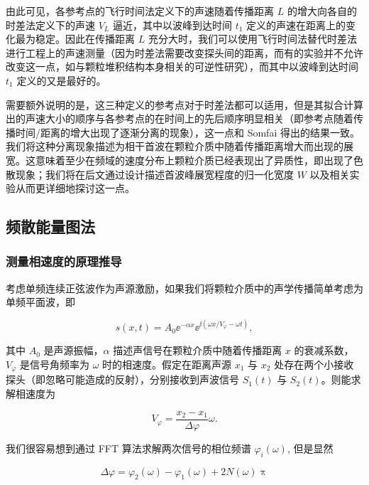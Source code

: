 由此可见，各参考点的飞行时间法定义下的声速随着传播距离 $L$ 的增大向各自的时差法定义下的声速 $V_{L}$ 逼近，其中以波峰到达时间 $t_{1}$ 定义的声速在距离上的变化最为稳定。因此在传播距离 $L$ 充分大时，我们可以使用飞行时间法替代时差法进行工程上的声速测量（因为时差法需要改变探头间的距离，而有的实验并不允许改变这一点，如与颗粒堆积结构本身相关的可逆性研究\cite{PhysRevE.84.020301}），而其中以波峰到达时间 $t_{1}$ 定义的又是最好的。

需要额外说明的是，这三种定义的参考点对于时差法都可以适用，但是其拟合计算出的声速大小的顺序与各参考点的在时间上的先后顺序明显相关（即参考点随着传播时间/距离的增大出现了逐渐分离的现象），这一点和 Somfai 得出的结果一致。我们将这种分离现象描述为相干首波在颗粒介质中随着传播距离增大而出现的展宽。这意味着至少在频域的速度分布上颗粒介质已经表现出了异质性，即出现了色散现象；我们将在后文通过设计描述首波峰展宽程度的归一化宽度 $W$ 以及相关实验从而更详细地探讨这一点。

\subsection{频散能量图法}

\subsubsection{测量相速度的原理推导}

考虑单频连续正弦波作为声源激励，如果我们将颗粒介质中的声学传播简单考虑为单频平面波，即

\begin{equation}
  s(x,t) = A_{0}{\ee}^{-\alpha x}{\ee}^{\ii(\omega x/V_{\varphi}-\omega t)},
  \label{eq:plane_wave}
\end{equation}

其中 $A_{0}$ 是声源振幅，$\alpha$ 描述声信号在颗粒介质中随着传播距离 $x$ 的衰减系数，$V_{\varphi}$ 是信号角频率为 $\omega$ 时的相速度。假定在距离声源 $x_{1}$ 与 $x_{2}$ 处存在两个小接收探头（即忽略可能造成的反射），分别接收到声波信号 $S_{1}(t)$ 与 $S_{2}(t)$。则能求解相速度为

\begin{equation}
  V_{\varphi} = \frac{x_{2}-x_{1}}{\Delta \varphi}\omega.\label{eq:phase_velocity}
\end{equation}

我们很容易想到通过 FFT 算法求解两次信号的相位频谱 $\varphi_{i}(\omega)$, 但是显然

\begin{equation}
  \Delta \varphi = \varphi_{2}(\omega) - \varphi_{1}(\omega) + 2N(\omega)\uppi
\end{equation}

